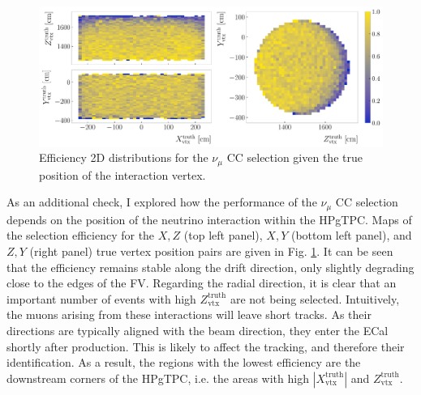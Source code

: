\begin{figure}[t]
	\centering
	\includegraphics[width=.99\linewidth]{Images/GAr_selection/numuCC_selection_true_vertex_performance.pdf}
	\caption{Efficiency 2D distributions for the $\nu_{\mu}$ CC selection given the true position of the interaction vertex.}
	\label{fig:numuCC_vertex_efficiency}
\end{figure}

As an additional check, I explored how the performance of the $\nu_{\mu}$ CC selection depends on the position of the neutrino interaction within the HPgTPC. Maps of the selection efficiency for the $X,Z$ (top left panel), $X,Y$ (bottom left panel), and $Z,Y$ (right panel) true vertex position pairs are given in Fig. \ref{fig:numuCC_vertex_efficiency}. It can be seen that the efficiency remains stable along the drift direction, only slightly degrading close to the edges of the FV. Regarding the radial direction, it is clear that an important number of events with high $Z^{\mathrm{truth}}_{\mathrm{vtx}}$ are not being selected. Intuitively, the muons arising from these interactions will leave short tracks. As their directions are typically aligned with the beam direction, they enter the ECal shortly after production. This is likely to affect the tracking, and therefore their identification. As a result, the regions with the lowest efficiency are the downstream corners of the HPgTPC, i.e. the areas with high $|X^{\mathrm{truth}}_{\mathrm{vtx}}|$ and $Z^{\mathrm{truth}}_{\mathrm{vtx}}$.

